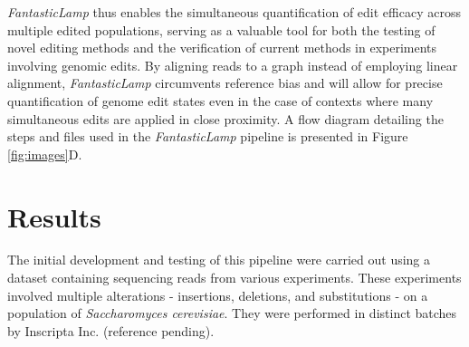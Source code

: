 \documentclass{bioinfo}
\theoremstyle{definition}
\begin{document}
\textit{FantasticLamp} thus enables the simultaneous quantification of edit efficacy across multiple edited populations, serving as a valuable tool for both the testing of novel editing methods and the verification of current methods in experiments involving genomic edits.
By aligning reads to a graph instead of employing linear alignment, \textit{FantasticLamp} circumvents reference bias and will allow for precise quantification of genome edit states even in the case of contexts where many simultaneous edits are applied in close proximity.
A flow diagram detailing the steps and files used in the \textit{FantasticLamp} pipeline is presented in Figure \ref{fig:images}D.



\section*{Results}
\label{sec:results}

The initial development and testing of this pipeline were carried out using a dataset containing sequencing reads from various experiments. These experiments involved multiple alterations - insertions, deletions, and substitutions - on a population of \textit{Saccharomyces cerevisiae}. They were performed in distinct batches by Inscripta Inc. (reference pending).
\end{document}
